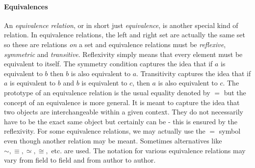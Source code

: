 \paragraph{Equivalences} An \emph{equivalence relation}, or in short just \emph{equivalence}, is another special kind of relation. In equivalence relations, the left and right set are actually the same set so these are relations \emph{on} a set and equivalence relations must be \emph{reflexive}, \emph{symmetric} and \emph{transitive}. Reflexivity simply means that every element must be equivalent to itself. The symmetry condition captures the idea that if $a$ is equivalent to $b$ then $b$ is also equivalent to $a$. Transitivity captures the idea that if $a$ is equivalent to $b$ and $b$ is equivalent to $c$, then $a$ is also equivalent to $c$. The prototype of an equivalence relation is the usual equality denoted by $=$ but the concept of an equivalence is more general. It is meant to capture the idea that two objects are interchangeable within a given context. They do not necessarily have to be the exact same object but certainly can be - this is ensured by the reflexivity. For some equivalence relations, we may actually use the $=$ symbol even though another relation may be meant. Sometimes alternatives like $\sim, \equiv, \simeq, \cong,$ etc. are used. The notation for various equivalence relations may vary from field to field and from author to author. 




